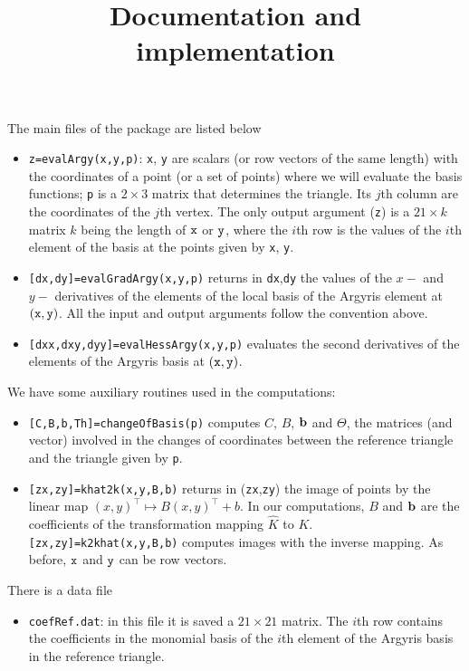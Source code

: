 \documentclass[a4paper,12pt]{article}
\title{Documentation and implementation}
\author{}
\begin{document}
\maketitle


The main files of the package are listed below
\begin{itemize}
\item {\tt z=evalArgy(x,y,p)}: {\tt x}, {\tt y} are scalars (or row vectors of
the same
length) with the coordinates of a point (or a set of points) where we
will evaluate the basis functions; {\tt p} is a $2\times 3$ matrix
that determines the triangle. Its $j$th column are the coordinates
of the $j$th vertex. The only output argument ({\tt z}) is  a
$21\times k$ matrix $k$ being the length of ${\tt x}$ or ${\tt y}$,
where the $i$th row is  the values of the $i$th element of the basis
at the points given by {\tt x}, {\tt y}.


\item {\tt [dx,dy]=evalGradArgy(x,y,p)} returns in {\tt dx},{\tt dy}
the values of the  $x-$ and $y-$ derivatives of the  elements of the
local basis of the Argyris element at $({\tt x},{\tt y})$. All the
input and output arguments follow the convention above.



\item {\tt [dxx,dxy,dyy]=evalHessArgy(x,y,p)} evaluates
the second  derivatives of the elements of the Argyris basis at
$({\tt x},{\tt y})$.
\end{itemize}

We have some auxiliary routines used in the computations:
\begin{itemize}

\item {\tt [C,B,b,Th]=changeOfBasis(p)} computes $C$, $B$, ${\bf b}$ and
$\Theta$, the matrices (and vector) involved in the changes of
coordinates between the reference triangle and the triangle given by
{\tt p}.

\item {\tt [zx,zy]=khat2k(x,y,B,b)} returns in ({\tt zx},{\tt zy}) the image
of points by the linear map $(x,y)^\top \mapsto B (x,y)^\top + b$.
In our computations, $B$ and ${\bf b}$ are the coefficients of the
transformation mapping $\widehat K$ to $K$. {\tt
[zx,zy]=k2khat(x,y,B,b)} computes images with the inverse mapping.
As before, ${\tt x}$ and ${\tt y}$ can be row vectors.
\end{itemize}

There is a data file
\begin{itemize}
\item {\tt coefRef.dat}: in this file it is saved a $21\times21$
matrix. The $i$th row contains the coefficients in the monomial
basis of the $i$th element of the Argyris basis in the reference
triangle.
\end{itemize}
\end{document}
